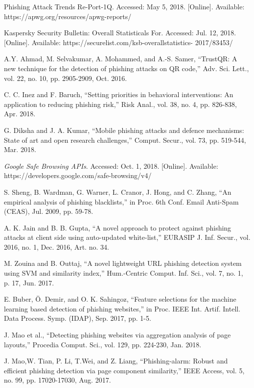 \documentclass{ieeeaccess}
\begin{document}
\begin{thebibliography}{00}

 Phishing Attack Trends Re-Port-1Q. Accessed: May 5, 2018.
[Online]. Available: https://apwg.org/resources/apwg-reports/

 Kaspersky Security Bulletin: Overall Statisticals For. Accessed:
Jul. 12, 2018. [Online]. Available: https://securelist.com/ksb-overallstatistics-
2017/83453/

 A.Y. Ahmad, M. Selvakumar, A. Mohammed, and A.-S. Samer, ``TrustQR:
A new technique for the detection of phishing attacks on QR code,'' Adv.
Sci. Lett., vol. 22, no. 10, pp. 2905-2909, Oct. 2016.

 C. C. Inez and F. Baruch, ``Setting priorities in behavioral interventions: An application to reducing phishing risk,'' Risk Anal., vol. 38, no. 4, pp. 826-838, Apr. 2018.

 G. Diksha and J. A. Kumar, ``Mobile phishing attacks and defence mechanisms: State of art and open research challenges,'' Comput. Secur., vol. 73,
pp. 519-544, Mar. 2018.

 \textit{Google Safe Browsing APIs}. Accessed: Oct. 1, 2018. [Online]. Available: https://developers.google.com/safe-browsing/v4/

 S. Sheng, B. Wardman, G. Warner, L. Cranor, J. Hong, and C. Zhang,
``An empirical analysis of phishing blacklists,'' in Proc. 6th Conf. Email
Anti-Spam (CEAS), Jul. 2009, pp. 59-78.

 A. K. Jain and B. B. Gupta, ``A novel approach to protect against phishing attacks at client side using auto-updated white-list,'' EURASIP J. Inf.
Secur., vol. 2016, no. 1, Dec. 2016, Art. no. 34.

 M. Zouina and B. Outtaj, ``A novel lightweight URL phishing detection
system using SVM and similarity index,'' Hum.-Centric Comput. Inf. Sci.,
vol. 7, no. 1, p. 17, Jun. 2017.

 E. Buber, Ö. Demir, and O. K. Sahingoz, ``Feature selections for the
machine learning based detection of phishing websites,'' in Proc. IEEE
Int. Artif. Intell. Data Process. Symp. (IDAP), Sep. 2017, pp. 1-5.

 J. Mao et al., ``Detecting phishing websites via aggregation analysis of page layouts,'' Procedia Comput. Sci., vol. 129, pp. 224-230, Jan. 2018.

 J. Mao,W. Tian, P. Li, T.Wei, and Z. Liang, ``Phishing-alarm: Robust and efficient phishing detection via page component similarity,'' IEEE Access,
vol. 5, no. 99, pp. 17020-17030, Aug. 2017.


\end{thebibliography}
\end{document}
